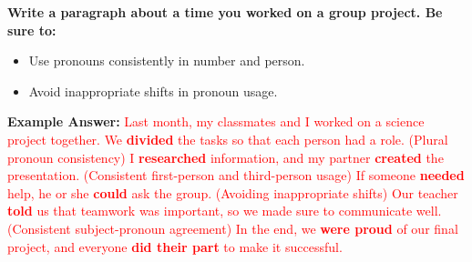 \documentclass[12pt]{article}
\begin{document}
\begin{tcolorbox}[colframe=black!60, colback=white, 
coltitle=black, colbacktitle=black!15, fonttitle=\bfseries\Large, 
title=Exit Ticket, halign title=center, left=10pt, right=10pt, top=5pt, bottom=15pt]

\textbf{Write a paragraph about a time you worked on a group project. Be sure to:}
\begin{itemize}
    \item Use pronouns consistently in number and person.  
    \item Avoid inappropriate shifts in pronoun usage.  
\end{itemize}

\vspace{2em}

\textbf{Example Answer:}  
\textcolor{red}{
Last month, my classmates and I worked on a science project together. We \textbf{divided} the tasks so that each person had a role. (Plural pronoun consistency) I \textbf{researched} information, and my partner \textbf{created} the presentation. (Consistent first-person and third-person usage) If someone \textbf{needed} help, he or she \textbf{could} ask the group. (Avoiding inappropriate shifts) Our teacher \textbf{told} us that teamwork was important, so we made sure to communicate well. (Consistent subject-pronoun agreement) In the end, we \textbf{were proud} of our final project, and everyone \textbf{did their part} to make it successful.  
}

\end{tcolorbox}
\end{document}
